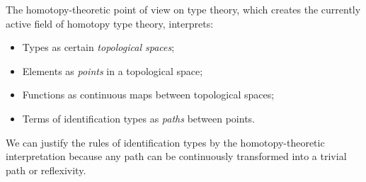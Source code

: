 \documentclass[11pt]{article}
\begin{document}
The homotopy-theoretic point of view on type theory, which creates the currently active field of homotopy type theory, interprets:

\begin{itemize}
\item Types as certain \emph{topological spaces};
\item Elements as \emph{points} in a topological space;
\item Functions as continuous maps between topological spaces;
\item Terms of identification types as \emph{paths} between points. 
\end{itemize}

We can justify the rules of identification types by the homotopy-theoretic interpretation because any path can be continuously transformed into a trivial path or reflexivity.

\printbibliography
\end{document}
